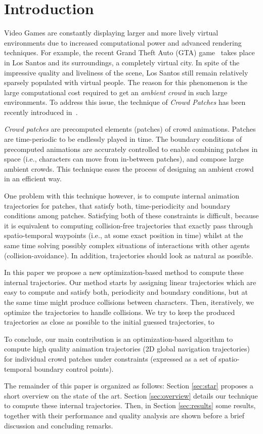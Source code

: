\section{Introduction}
\label{sec:intro}

Video Games are constantly displaying larger and more lively virtual environments due to increased computational power and advanced rendering techniques. For example, the recent Grand Theft Auto (GTA) game~\cite{GTA:web} takes place in Los Santos and its surroundings, a completely virtual city. In spite of the impressive quality and liveliness of the scene, Los Santos still remain relatively sparsely populated with virtual people. The reason for this phenomenon is the large computational cost required to get an {\it ambient crowd} in such large environments. To address this issue, the technique of {\it Crowd Patches} has been recently introduced in~\cite{Yersin:2009}. 

{\it Crowd patches} are precomputed elements (patches) of crowd animations. Patches are time-periodic to be endlessly played in time. The boundary conditions of precomputed animations are accurately controlled to enable combining patches in space (i.e., characters can move from in-between patches), and compose large ambient crowds. This technique eases the process of designing an ambient crowd in an efficient way. 

One problem with this technique however, is to compute internal animation trajectories for patches, that satisfy both, time-periodicity and boundary conditions among patches. Satisfying both of these constraints is difficult, because it is equivalent to computing collision-free trajectories that exactly pass through spatio-temporal waypoints (i.e., at some exact position in time) whilst at the same time solving possibly complex situations of interactions with other agents (collision-avoidance). In addition, trajectories should look as natural as possible.

In this paper we propose a new optimization-based method to compute these internal trajectories. Our method starts by assigning linear trajectories which are easy to compute and satisfy both, periodicity and boundary conditions, but at the same time might produce collisions between characters. Then, iteratively, we optimize the trajectories to handle collisions. We try to keep the produced trajectories as close as possible to the initial guessed trajectories, to   

To conclude, our main contribution is an optimization-based algorithm to compute high quality animation trajectories (2D global navigation trajectories) for individual crowd patches under constraints (expressed as a set of spatio-temporal boundary control points).

The remainder of this paper is organized as follows: Section \ref{sec:star} proposes a short overview on the state of the art. Section \ref{sec:overview} details our technique to compute these internal trajectories. Then, in Section \ref{sec:results} some results, together with their performance and quality analysis are shown before a brief discussion and concluding remarks. 
